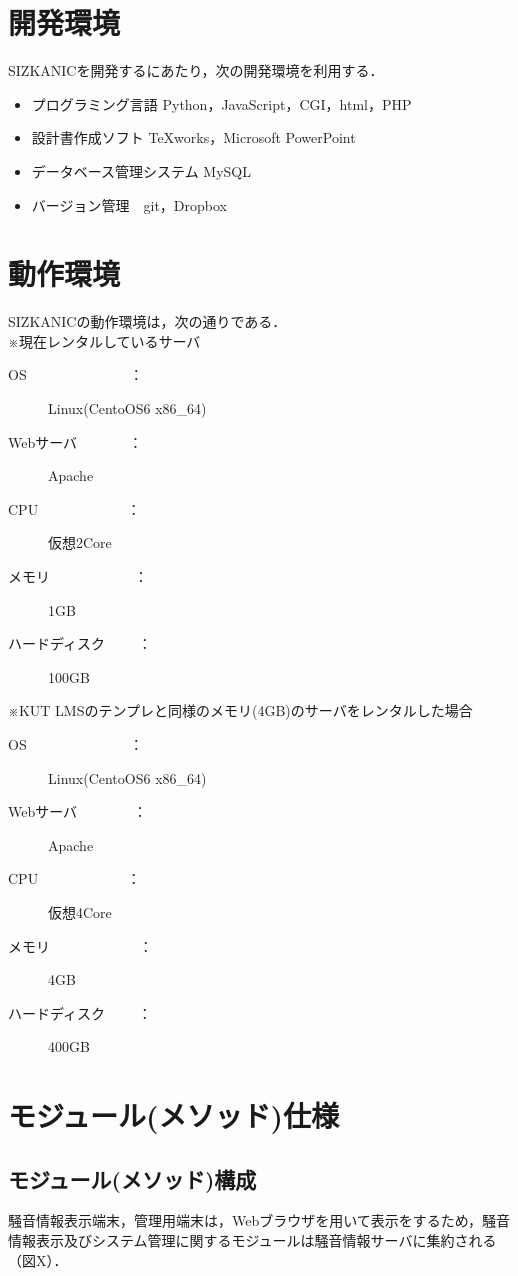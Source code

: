 \newpage

\section{開発環境}
SIZKANICを開発するにあたり，次の開発環境を利用する．

\begin{itemize}
\item プログラミング言語 Python，JavaScript，CGI，html，PHP

\item 設計書作成ソフト TeXworks，Microsoft PowerPoint

\item データベース管理システム MySQL

\item バージョン管理　git，Dropbox

\end{itemize}
\section{動作環境}
SIZKANICの動作環境は，次の通りである．\\
※現在レンタルしているサーバ
\begin{description}
 \item[OS　　　　　　  　：] Linux(CentoOS6 x86\_64)
 \item[Webサーバ  　　　 ：] Apache
 \item[CPU　　　　　　 ：] 仮想2Core
 \item[メモリ 　　　 　　 ：] 1GB
 \item[ハードディスク　 　：] 100GB
\end{description}

※KUT LMSのテンプレと同様のメモリ(4GB)のサーバをレンタルした場合
\fi
\begin{description}
 \item[OS　　　　　　　  ：] Linux(CentoOS6 x86\_64)
 \item[Webサーバ　　　　：] Apache
 \item[CPU　　　　　　 ：] 仮想4Core
 \item[メモリ　　　　　　 ：] 4GB
 \item[ハードディスク　 　：] 400GB
\end{description}
\section{モジュール(メソッド)仕様}
\subsection{モジュール(メソッド)構成}
騒音情報表示端末，管理用端末は，Webブラウザを用いて表示をするため，騒音情報表示及びシステム管理に関するモジュールは騒音情報サーバに集約される（図X）．

